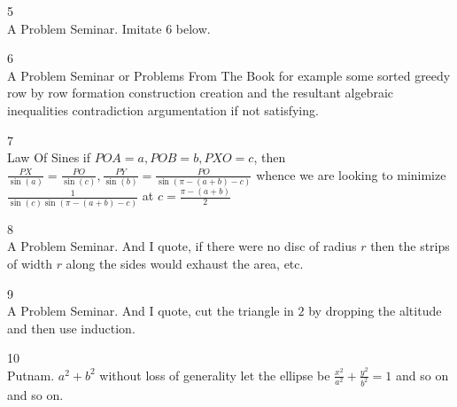 5 \\
A Problem Seminar. Imitate 6 below.

6 \\
A Problem Seminar or Problems From The Book for example some sorted greedy row by row formation construction creation and the resultant algebraic inequalities contradiction argumentation if not satisfying.

7 \\
Law Of Sines if $POA=a,POB=b,PXO=c$, then $\frac{PX}{\sin(a)}=\frac{PO}{\sin(c)},\frac{PY}{\sin(b)}=\frac{PO}{\sin(\pi-(a+b)-c)}$ whence we are looking to minimize $\frac{1}{\sin(c)\sin(\pi-(a+b)-c)}$ at $\boxed{c=\frac{\pi-(a+b)}{2}}$

8 \\
A Problem Seminar. And I quote, if there were no disc of radius $r$ then the strips of width $r$ along the sides would exhaust the area, etc.

9 \\
A Problem Seminar. And I quote, cut the triangle in $2$ by dropping the altitude and then use induction.

10 \\
Putnam. $\boxed{a^2+b^2}$ without loss of generality let the ellipse be $\frac{x^2}{a^2}+\frac{y^2}{b^2}=1$ and so on and so on.